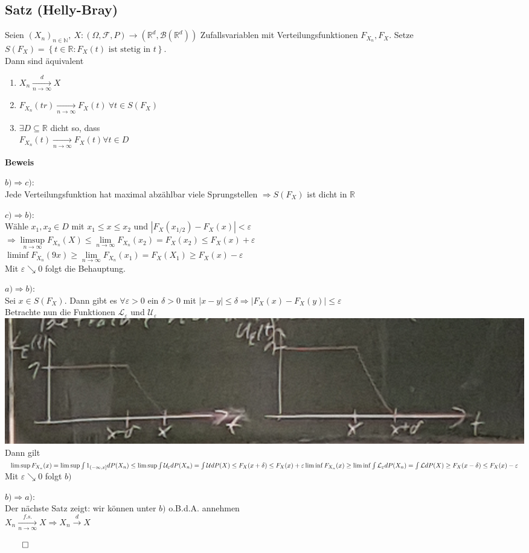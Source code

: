 \documentclass[german,10pt,oneside, fleqn, a4paper]{article}
\newcommand {\R}	{\mathbb{R}}
\newcommand {\N}	{\mathbb{N}}
\newcommand{\Ra}	{\Rightarrow}
\newcommand{\ra}{\rightarrow}
\newcommand{\lsup}[1][n]{\limsup\limits_{#1\rightarrow\infty}}
\newcommand{\brc}[1]{\left(#1\right)}
\newcommand{\brac}[1]{\left\lbrace #1\right\rbrace}
\newcommand{\folge}[3][\N]{\left(#2_#3\right)_{#3\in #1}}
\newcommand{\QED}{\begin{flushright}$\qed$\end{flushright}}
\newcommand{\mc}[1]{\mathcal{#1}}
\newcommand{\beweis}{\textbf{Beweis}\\}
\newcommand{\toinf}{\rightarrow\infty}
\newcommand{\1}[1]{1_{#1}}
\newcommand{\2}[1]{\1{\brac{#1}}}
\newcommand{\xr}[2][]{\xrightarrow[#1]{#2}}
\newcommand{\rbor}[1][d]{\brc{\R^{#1},\mc{B}\brc{\R^{#1}}}}
\newcommand{\raum}{\brc{\Omega,\mc{F},P}}
\newcommand{\fe}{\forall\varepsilon>0}
\newcommand{\Xn}{X_n}
\begin{document}
\subsection{Satz (Helly-Bray)}
\label{3.8}
Seien $\folge{X}{n},\ X:\raum\ra\rbor$ Zufallsvariablen mit Verteilungsfunktionen $F_{X_n}, F_X$. Setze\\
$S(F_X)=\brac{t\in\R:F_X(t)\text{ ist stetig in }t}.$\\
Dann sind äquivalent\begin{enumerate}[label=(\alph*)]
\item $X_n\xr[n\toinf]{d}X$
\item $F_{X_n}(tr)\xr[n\toinf]{}F_X(t)\ \forall t\in S(F_X)$
\item $\exists D\subseteq\R$ dicht so, dass\\
$F_{X_n}(t)\xr[n\toinf]{}F_X(t)\forall t\in D$
\end{enumerate}
\beweis
\begin{list}{•}{}
\item $b)\Ra c)$:\\
 Jede Verteilungsfunktion hat maximal abzählbar viele Sprungstellen $\Ra S(F_X)$ ist dicht in $\R$
\item $c)\Ra b)$:\\
Wähle $x_1,x_2\in D$ mit $x_1\leq x\leq x_2$ und $|F_X(x_{1/2})-F_X(x)|<\varepsilon$\\
$\Ra \lsup F_{X_n}(X)\leq \lim\limits_{n\toinf}F_{X_n}(x_2)=F_X(x_2)\leq F_X(x)+\varepsilon$\\
$\liminf F_{X_n}(9x)\geq \lim\limits_{n\toinf}F_{X_n}(x_1)=F_X(X_1)\geq F_X(x)-\varepsilon$\\
Mit $\varepsilon\searrow0$ folgt die Behauptung.
\item $a)\Ra b)$:\\
Sei $x\in S(F_X)$. Dann gibt es $\fe$ ein $\delta>0$ mit $|x-y|\leq\delta\Ra|F_X(x)-F_X(y)|\leq\varepsilon$\\
Betrachte nun die Funktionen $\mc{L}_\varepsilon$ und $\mc{U}_\varepsilon$\\
\includegraphics[scale=0.15]{3_8.png}
Dann gilt\\
$\limsup F_{\Xn}(x)=\limsup\int \1{(-\infty,x]}dP(\Xn)\leq\limsup\int \mc{U}_\varepsilon dP(X_n)=\int\mc{U}dP(X)\leq F_X(x+\delta)\leq F_X(x)+\varepsilon\\
\liminf F_{\Xn}(x)\geq\liminf\int \mc{L}_\varepsilon dP(X_n)=\int\mc{L}dP(X)\geq F_X(x-\delta)\leq F_X(x)-\varepsilon$\\
Mit $\varepsilon\searrow0$ folgt $b)$
\item $b)\Ra a)$:\\
Der nächste Satz zeigt: wir können unter $b)$ o.B.d.A. annehmen\\
$X_n\xr[n\toinf]{f.s.}X\Ra X_n\xr{d}X$\QED
\end{list}
\end{document}
